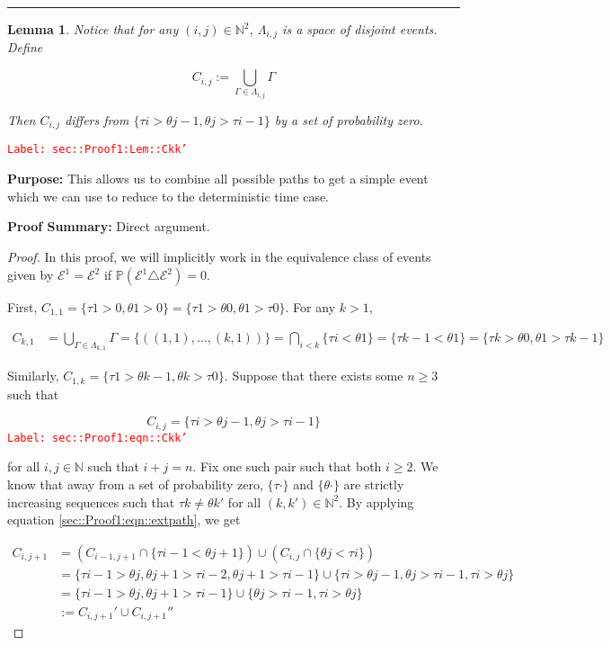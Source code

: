 \documentclass[12pt]{article}
\newcommand{\mb}{\mathbb}
\newcommand{\mc}{\mathcal}
\newcommand{\tr}{\textcolor{red}}
\newcommand{\labe}[1]{\tr{\texttt{Label: #1}}}
\newcommand{\purpose}{\textbf{Purpose: }}
\newcommand{\pfsum}{\textbf{Proof Summary: }}
\newcommand{\ind}{\hspace{24pt}}
\newcommand{\lin}{\rule{\linewidth}{0.4 pt}}
\newcommand{\pr}{\mb{P}}							%
\newcommand{\rt}{\tau}							%
\newcommand{\rtt}{\theta}						%
\renewcommand{\it}{k}							%
\newcommand{\apath}{\Gamma}						%
\newcommand{\pathset}[2]{\Lambda_{#1,#2}}		%
\newcommand{\pathsete}[2]{C_{#1,#2}}			%
\newcommand{\evnt}{\mc{E}}						%
\newtheorem{lem}[thms]{Lemma}
\begin{document}
\lin

\begin{lem}
Notice that for any \((i,j) \in \mb{N}^2\), \(\pathset{i}{j}\) is a space of disjoint events. Define

\[\pathsete{i}{j} := \bigcup_{\apath{}\in\pathset{i}{j}} \apath{}\]

Then \(\pathsete{i}{j}\) differs from \(\{\rt{i} > \rtt{j-1}, \rtt{j} > \rt{i-1}\}\) by a set of probability zero.
\label{sec::Proof1:Lem::Ckk'}
\end{lem}
\labe{sec::Proof1:Lem::Ckk'}

\purpose This allows us to combine all possible paths to get a simple event which we can use to reduce to the deterministic time case.

\pfsum Direct argument.

\begin{proof}
In this proof, we will implicitly work in the equivalence class of events given by \(\evnt{}^1 = \evnt{}^2\) if \(\pr(\evnt{}^1 \triangle \evnt{}^2) = 0\).  

\ind First, \(\pathsete{1}{1} = \{\rt{1} > 0,\rtt{1} > 0\} = \{\rt{1} > \rtt{0},\rtt{1}>\rt{0}\}\). For any \(\it > 1\),

\begin{align*}
\pathsete{\it}{1} &= \bigcup_{\apath{} \in \pathset{\it}{1}} \apath{} = \{((1,1),\dots,(\it,1))\} = \bigcap_{i < \it} \{\rt{i} < \rtt{1}\} = \{\rt{\it-1} < \rtt{1}\} = \{\rt{\it} > \rtt{0},\rtt{1} > \rt{\it-1}\}
\end{align*}

Similarly, \(\pathsete{1}{\it} = \{\rt{1} > \rtt{\it-1}, \rtt{\it} > \rt{0}\}\). Suppose that there exists some \(n\geq 3\) such that

\begin{equation}
\pathsete{i}{j} = \{\rt{i} > \rtt{j-1},\rtt{j} > \rt{i-1}\}
\label{sec::Proof1:eqn::Ckk'}
\end{equation}
\labe{sec::Proof1:eqn::Ckk'}

for all \(i, j\in \mb{N}\) such that \(i+j = n\). Fix one such pair such that both \(i \geq 2\). We know that away from a set of probability zero, \(\{\rt{\cdot}\}\) and \(\{\rtt{\cdot}\}\) are strictly increasing sequences such that \(\rt{\it} \neq \rtt{\it'}\) for all \((\it,\it')\in \mb{N}^2\). By applying equation \eqref{sec::Proof1:eqn::extpath}, we get

\begin{align*}
\pathsete{i}{j+1} &= \left(\pathsete{i-1}{j+1} \cap \{\rt{i - 1} < \rtt{j+1}\}\right) \cup \left(\pathsete{i}{j}\cap \{\rtt{j} < \rt{i}\}\right)\\
&= \{\rt{i - 1} > \rtt{j}, \rtt{j+1} > \rt{i - 2},  \rtt{j+1} > \rt{i -1}\}\cup\{\rt{i} > \rtt{j-1}, \rtt{j} > \rt{i - 1},\rt{i} > \rtt{j}\}\\
&= \{\rt{i - 1} > \rtt{j}, \rtt{j+1} > \rt{i - 1}\}\cup\{\rtt{j} > \rt{i - 1},\rt{i} > \rtt{j}\}\\
&:= \pathsete{i}{j+1}' \cup\pathsete{i}{j+1}''
\end{align*}


\end{proof}
\end{document}
